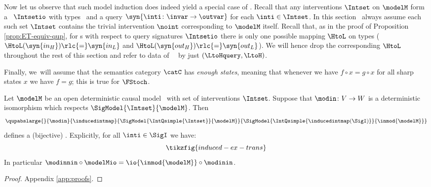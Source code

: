 \documentclass{article}
\begin{document}
Now let us observe that such model induction does indeed yield a special case of \rlc{\qupshort}. Recall that any interventions $\Intset$ on $\modelM$ form a \ $\Intsetio$ with types \rl{$\syn{\invar, \outvar}$}\ and a query $\syn{\inti \colon \invar \to \outvar}$ for each $\inti \in \Intset$. In this section \ always assume each such set $\Intset$ contains the trivial intervention $\noint$ corresponding to $\modelM$ itself.  
Recall that, as in the proof of Proposition \ref{prop:ET-equiv-qup}, for \qup s with respect to query signatures $\Intsetio$ there is only one possible mapping $\HtoL$ on types ($\HtoL(\syn{in_H}) \rlc{=} \syn{in_L}$ and $\HtoL(\syn{out_H}) \rlc{=} \syn{out_L}$).  
We will hence drop the corresponding $\HtoL$ throughout the rest of this section and refer to data of \ \qup\ by just $(\LtoHquery, \LtoH)$. 

Finally, we\ will assume that the semantics category $\catC$ has \emph{enough states}, meaning that whenever we have $f \circ x = g \circ x$ for all sharp states $x$ we have $f = g$; this is true for $\FStoch$.


\begin{proposition} \label{prop:Model-Induction}
Let $\modelM$ be an open deterministic causal model \ with set of interventions $\Intset$. Suppose that $\modin \colon V \to W$ is a deterministic isomorphism which respects $\SigModel{\Intset}{\modelM}$. Then 
\[
\qupabslarge{}{\modin}{\inducedintmap}{\SigModel{\IntQsimple{\Intset}}{\modelM}}{\SigModel{\IntQsimple{\inducedintmap(\SigI)}}{\inmod{\modelM}}}
\]
defines a (bijective) \qup.  
Explicitly, for all $\inti \in \SigI$ we have: 
\begin{equation} \label{eq:ex-trans-induced}
\tikzfig{induced-ex-trans}
\end{equation}
In particular $\modinnin \circ \modelMio = \io{\inmod{\modelM}} \circ \modinin$.
\end{proposition}

\begin{proof} Appendix \ref{app:proofs}.
\end{proof}
\end{document}
